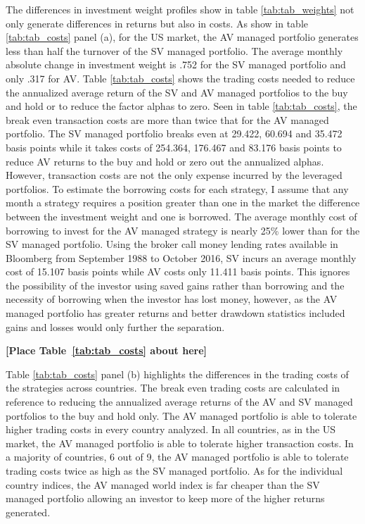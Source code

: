 The differences in investment weight profiles show in table \ref{tab:tab_weights} not only generate differences in returns but also in costs. As show in table \ref{tab:tab_costs} panel (a), for the US market, the AV managed portfolio generates less than half the turnover of the SV managed portfolio. The average monthly absolute change in investment weight is .752 for the SV managed portfolio and only .317 for AV. Table \ref{tab:tab_costs} shows the trading costs needed to reduce the annualized average return of the SV and AV managed portfolios to the buy and hold or to reduce the factor alphas to zero. \citep{frazzini_trading_2015,moreira_volatility-managed_2017} Seen in table \ref{tab:tab_costs}, the break even transaction costs are more than twice that for the AV managed portfolio. The SV managed portfolio breaks even at 29.422, 60.694 and 35.472 basis points while it takes costs of 254.364, 176.467 and 83.176 basis points to reduce AV returns to the buy and hold or zero out the annualized alphas. However, transaction costs are not the only expense incurred by the leveraged portfolios. To estimate the borrowing costs for each strategy, I assume that any month a strategy requires a position greater than one in the market the difference between the investment weight and one is borrowed. The average monthly cost of borrowing to invest for the AV managed strategy is nearly 25\% lower than for the SV managed portfolio. Using the broker call money lending rates available in Bloomberg from September 1988 to October 2016, SV incurs an average monthly cost of 15.107 basis points while AV costs only 11.411 basis points. This ignores the possibility of the investor using saved gains rather than borrowing and the necessity of borrowing when the investor has lost money, however, as the AV managed portfolio has greater returns and better drawdown statistics included gains and losses would only further the separation.
\bigskip
\centerline{\bf [Place Table~\ref{tab:tab_costs} about here]}
\bigskip

Table \ref{tab:tab_costs} panel (b) highlights the differences in the trading costs of the strategies across countries. The break even trading costs are calculated in reference to reducing the annualized average returns of the AV and SV managed portfolios to the buy and hold only. The AV managed portfolio is able to tolerate higher trading costs in every country analyzed. In all countries, as in the US market, the AV managed portfolio is able to tolerate higher transaction costs. In a majority of countries, 6 out of 9, the AV managed portfolio is able to tolerate trading costs twice as high as the SV managed portfolio. As for the individual country indices, the AV managed world index is far cheaper than the SV managed portfolio allowing an investor to keep more of the higher returns generated.